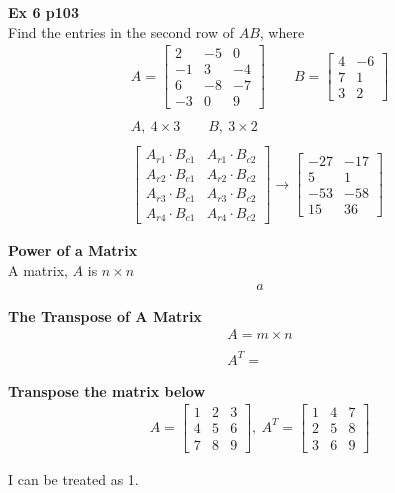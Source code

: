 \documentclass{article}
\begin{document}
    \textbf{Ex 6 p103}\\
    Find the entries in the second row of $ AB $, where
    \[
      \begin{gathered}
      A= \begin{bmatrix}
        2 &-5 &0\\
        -1 &3 &-4\\
        6 &-8 &-7\\
        -3 &0 &9
      \end{bmatrix}\qquad
      B=\begin{bmatrix}
        4 &-6\\
        7 &1\\
        3 &2
      \end{bmatrix}\\
      ~\\
      A,~4 \times 3 \qquad B,~3 \times 2\\
      ~\\
      \begin{bmatrix}
        A_{r1} \cdot B_{c1} &A_{r1} \cdot B_{c2}\\
        A_{r2} \cdot B_{c1} &A_{r2} \cdot B_{c2}\\
        A_{r3} \cdot B_{c1} &A_{r3} \cdot B_{c2}\\
        A_{r4} \cdot B_{c1} &A_{r4} \cdot B_{c2}                
      \end{bmatrix} \to
      \begin{bmatrix}
        -27 &-17\\
        5 &1\\
        -53 &-58\\
        15 &36
      \end{bmatrix}
      \end{gathered}
    \]

    \textbf{Power of a Matrix}\\
    A matrix, $ A $ is $ n \times n $
    \[
      \begin{gathered}
      a
      \end{gathered}
    \]

    \textbf{The Transpose of A Matrix}
    \[
      \begin{gathered}
      A = m \times n \\
      ~\\
      A^{T}= 
      \end{gathered}
    \]

    \textbf{Transpose the matrix below}
    \[
      \begin{gathered}
      A = \begin{bmatrix}
        1 &2 &3\\
        4 &5 &6\\
        7 &8 &9
      \end{bmatrix}, ~A^{T}=
      \begin{bmatrix}
        1 &4 &7\\
        2 &5 &8\\
        3 &6 &9
      \end{bmatrix}
      \end{gathered}
    \]
    
   I can be treated as 1. 
    
    
\end{document}
